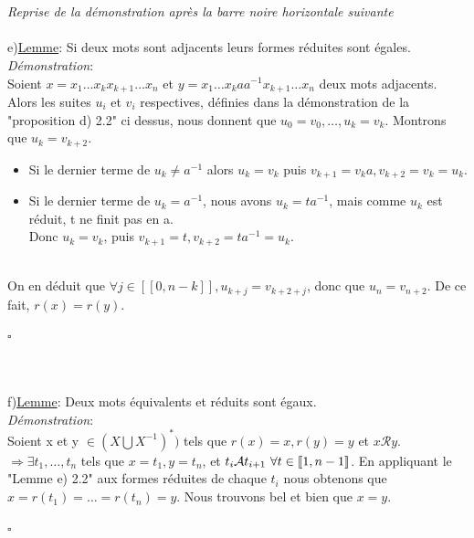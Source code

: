 \documentclass{article}
\begin{document}
\hline \\~\\
\textit{Reprise de la démonstration après la barre noire horizontale suivante}\\~\\

e)\underline{Lemme}:
Si deux mots sont adjacents leurs formes réduites sont égales.
\\

\textit{Démonstration}:\\
Soient $x=x_1\dots x_kx_{k+1}\dots x_n$ et $y=x_1\dots x_kaa^{-1}x_{k+1}\dots x_n$ deux mots adjacents. Alors les suites $u_i$ et $v_i$ respectives, définies dans la démonstration de la "proposition d) 2.2" ci dessus, nous donnent que $u_0=v_0, \dots, u_k=v_k$. Montrons que $u_k=v_{k+2}$.\\
\begin{itemize}
    \item Si le dernier terme de $u_{k} \neq a^{-1}$ alors $u_k=v_k$ puis $v_{k+1}=v_ka, v_{k+2}=v_k=u_k$.
    \item Si le dernier terme de $u_{k}=a^{-1}$, nous avons $u_k=ta^{-1}$, mais comme $u_k$ est réduit, t ne finit pas en a.\\
    Donc $u_k=v_k$, puis $v_{k+1}=t, v_{k+2}=ta^{-1}=u_k$.
\end{itemize}\\
On en déduit que $\forall j \in [\![0,n-k]\!], u_{k+j}=v_{k+2+j}$, donc que $u_n=v_{n+2}$.
De ce fait, $r(x)=r(y)$.\\
\begin{flushright}
$\square$
\end{flushright}\\~\\

f)\underline{Lemme}: Deux mots équivalents et réduits sont égaux.
\\

\textit{Démonstration}:\\
Soient x et y $\in (X\bigcup X^{-1})^{*})$ tels que $r(x)=x,  r(y)=y$ et $x\mathcal{R}y$. \\ $\Rightarrow \exists t_1, \dots, t_n$ tels que $x=t_1, y=t_n$, et $t_i\mathcal{A}t_{i+1} \hspace{0.12cm} \forall t \in [\![1,n-1]\!]$.
En appliquant le "Lemme e) 2.2" aux formes réduites de chaque $t_i$ nous obtenons que $x=r(t_1)=\dots=r(t_n)=y$.
Nous trouvons bel et bien que $x=y$.\\
\begin{flushright}
$\square$
\end{flushright}\\
\end{document}
